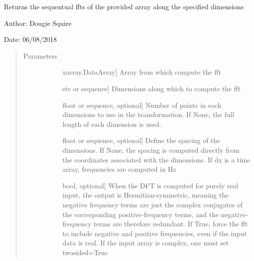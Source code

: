 \documentclass[letterpaper,10pt,english]{sphinxmanual}
\begin{document}
\begin{fulllineitems}
\label{\detokenize{utils_doc:utils.fft}}
Returns the sequentual ffts of the provided array along the specified dimensions

\begin{DUlineblock}{0em}
\item[] Author: Dougie Squire
\item[] Date: 06/08/2018
\end{DUlineblock}
\begin{quote}\begin{description}
\item[{Parameters}] \leavevmode\begin{description}
\item[{}] \leavevmode{[}xarray.DataArray{]}
Array from which compute the fft

\item[{}] \leavevmode{[}str or sequence{]}
Dimensions along which to compute the fft

\item[{}] \leavevmode{[}float or sequence, optional{]}
Number of points in each dimensions to use in the transformation. If None, the full length                    of each dimension is used.

\item[{}] \leavevmode{[}float or sequence, optional{]}
Define the spacing of the dimensions. If None, the spacing is computed directly from the                     coordinates associated with the dimensions. If dx is a time array, frequencies are computed                     in Hz

\item[{}] \leavevmode{[}bool, optional{]}
When the DFT is computed for purely real input, the output is Hermitian-symmetric,                     meaning the negative frequency terms are just the complex conjugates of the corresponding                     positive-frequency terms, and the negative-frequency terms are therefore redundant.                    If True, force the fft to include negative and positive frequencies, even if the input                     data is real. If the input array is complex, one must set twosided=True


\end{description}
\end{description}
\end{quote}
\end{fulllineitems}
\end{document}
